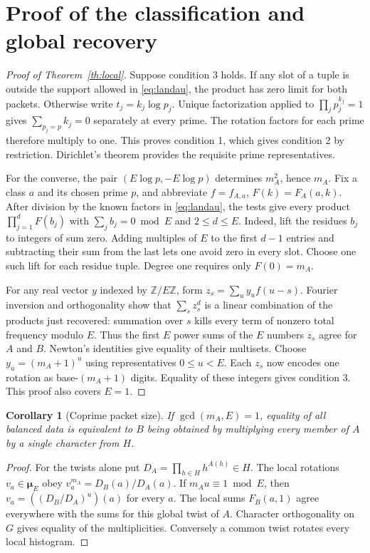 \documentclass[11pt,letterpaper]{article}
\newtheorem{corollary}[theorem]{Corollary}
\newcommand{\Z}{\mathbb Z}
\newcommand{\muE}{\boldsymbol\mu_E}
\begin{document}
\section{Proof of the classification and global recovery}
\begin{proof}[Proof of Theorem~\ref{th:local}]
Suppose condition 3 holds. If any slot of a tuple is outside the support allowed in \eqref{eq:landau}, the product has zero limit for both packets. Otherwise write $t_j=k_j\log p_j$. Unique factorization applied to $\prod_j p_j^{k_j}=1$ gives $\sum_{p_j=p} k_j=0$ separately at every prime. The rotation factors for each prime therefore multiply to one. This proves condition 1, which gives condition 2 by restriction. Dirichlet's theorem provides the requisite prime representatives.

For the converse, the pair $(E\log p,-E\log p)$ determines $m_A^2$, hence $m_A$. Fix a class $a$ and its chosen prime $p$, and abbreviate $f=f_{A,a}$, $F(k)=F_A(a,k)$. After division by the known factors in \eqref{eq:landau}, the tests give every product $\prod_{j=1}^d F(b_j)$ with $\sum_j b_j=0\bmod E$ and $2\le d\le E$. Indeed, lift the residues $b_j$ to integers of sum zero. Adding multiples of $E$ to the first $d-1$ entries and subtracting their sum from the last lets one avoid zero in every slot. Choose one such lift for each residue tuple. Degree one requires only $F(0)=m_A$.

For any real vector $y$ indexed by $\Z/E\Z$, form $z_s=\sum_u y_u f(u-s)$. Fourier inversion and orthogonality show that $\sum_s z_s^d$ is a linear combination of the products just recovered: summation over $s$ kills every term of nonzero total frequency modulo $E$. Thus the first $E$ power sums of the $E$ numbers $z_s$ agree for $A$ and $B$. Newton's identities give equality of their multisets. Choose $y_u=(m_A+1)^u$ using representatives $0\le u<E$. Each $z_s$ now encodes one rotation as base-$(m_A+1)$ digits. Equality of these integers gives condition 3. This proof also covers $E=1$.
\end{proof}

\begin{corollary}[Coprime packet size]\label{th:glue}
If $\gcd(m_A,E)=1$, equality of all balanced data is equivalent to $B$ being obtained by multiplying every member of $A$ by a single character from $H$.
\end{corollary}
\begin{proof}
For the twists alone put $D_A=\prod_{h\in H}h^{A(h)}\in H$. The local rotations $v_a\in\muE$ obey $v_a^{m_A}=D_B(a)/D_A(a)$. If $m_Au\equiv1\bmod E$, then $v_a=((D_B/D_A)^u)(a)$ for every $a$. The local sums $F_B(a,1)$ agree everywhere with the sums for this global twist of $A$. Character orthogonality on $G$ gives equality of the multiplicities. Conversely a common twist rotates every local histogram.
\end{proof}
\end{document}

